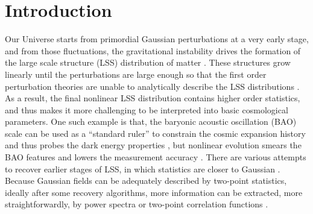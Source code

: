 \documentclass[aps,prd,twocolumn,superscriptaddress,amsfont,amssymb,amsmath,nofootinbib,showpacs,balancelastpage]{revtex4-1}
\begin{document}
\section{Introduction}\label{sec.intro}
Our Universe starts from primordial Gaussian perturbations at a very early stage, 
and from those fluctuations, the gravitational instability drives the formation of 
the large scale structure (LSS) distribution of matter
\citep{1970A&A.....5...84Z,1985ApJ...292..371D}.
These structures grow 
linearly until the perturbations are large enough so that the first order 
perturbation theories are unable to analytically describe the LSS distributions 
\citep{2016JCAP...01..043M}. 
As a result, the final nonlinear LSS distribution contains higher order 
statistics, and thus makes it more challenging to be interpreted into basic
cosmological parameters. One such example is that, the baryonic acoustic oscillation (BAO)
scale can be used as a ``standard ruler'' to constrain the cosmic expansion history
and thus probes the dark energy properties \citep{2005NewAR..49..360E}, but
nonlinear evolution smears the BAO features and lowers the measurement
accuracy \citep{2005ApJ...633..560E,2012MNRAS.419.2949N}.
There are various attempts to recover earlier stages
of LSS, in which statistics are closer to Gaussian 
\citep{1992MNRAS.254..315W,2013MNRAS.436..759H}.
Because Gaussian fields can be adequately described by two-point statistics,
ideally after some recovery algorithms, more information can be extracted,
more straightforwardly, by power spectra or two-point correlation functions
\citep{2005MNRAS.360L..82R,2012MNRAS.421..832Y}.
\end{document}
